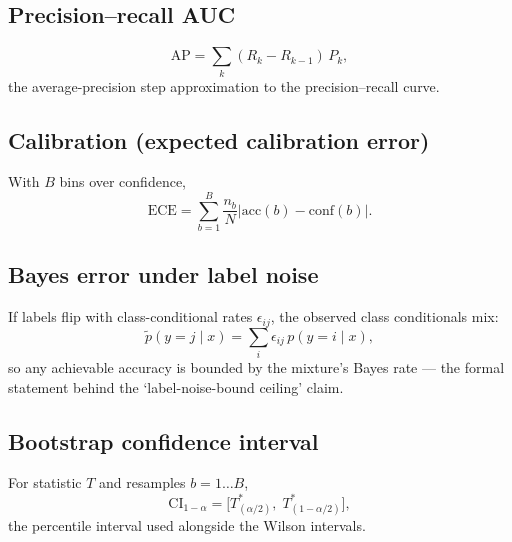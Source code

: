 \subsection{Precision--recall AUC}
\begin{equation}
\mathrm{AP} = \sum_k (R_k - R_{k-1})\, P_k ,
\end{equation}
the average-precision step approximation to the precision--recall curve.
\subsection{Calibration (expected calibration error)}
With $B$ bins over confidence,
\begin{equation}
\mathrm{ECE} = \sum_{b=1}^{B} \frac{n_b}{N}
\left| \mathrm{acc}(b) - \mathrm{conf}(b) \right| .
\end{equation}
\subsection{Bayes error under label noise}
If labels flip with class-conditional rates $\epsilon_{ij}$, the observed
class conditionals mix:
\begin{equation}
\tilde p(y = j \mid x) = \sum_i \epsilon_{ij}\, p(y = i \mid x),
\end{equation}
so any achievable accuracy is bounded by the mixture's Bayes rate ---
the formal statement behind the `label-noise-bound ceiling' claim.
\subsection{Bootstrap confidence interval}
For statistic $T$ and resamples $b = 1 \dots B$,
\begin{equation}
\mathrm{CI}_{1-\alpha} = \big[ T^{*}_{(\alpha/2)},\; T^{*}_{(1-\alpha/2)} \big],
\end{equation}
the percentile interval used alongside the Wilson intervals.
